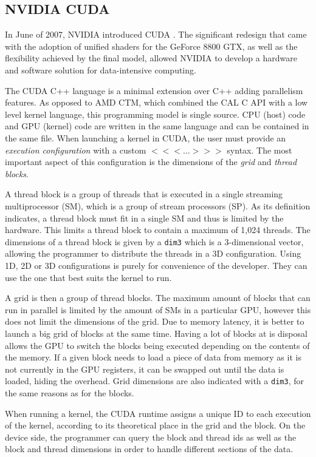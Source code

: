 \subsection{NVIDIA CUDA}

In June of 2007, NVIDIA introduced CUDA \cite{cuda_toolkit_archive}. The significant redesign that came with the adoption of unified shaders for the GeForce 8800 GTX, as well as the flexibility achieved by the final model, allowed NVIDIA to develop a hardware and software solution for data-intensive computing.

The CUDA C++ language is a minimal extension over C++ adding parallelism features. As opposed to AMD CTM, which combined the CAL C API with a low level kernel language, this programming model is single source. CPU (host) code and GPU (kernel) code are written in the same language and can be contained in the same file. When launching a kernel in CUDA, the user must provide an \textit{execution configuration} with a custom $<<< ... >>>$ syntax. The most important aspect of this configuration is the dimensions of the \textit{grid} and \textit{thread blocks}.

A thread block is a group of threads that is executed in a single streaming multiprocessor (SM), which is a group of stream processors (SP). As its definition indicates, a thread block must fit in a single SM and thus is limited by the hardware. This limits a thread block to contain a maximum of 1,024 threads. The dimensions of a thread block is given by a \texttt{dim3} which is a 3-dimensional vector, allowing the programmer to distribute the threads in a 3D configuration. Using 1D, 2D or 3D configurations is purely for convenience of the developer. They can use the one that best suits the kernel to run.

A grid is then a group of thread blocks. The maximum amount of blocks that can run in parallel is limited by the amount of SMs in a particular GPU, however this does not limit the dimensions of the grid. Due to memory latency, it is better to launch a big grid of blocks at the same time. Having a lot of blocks at is disposal allows the GPU to switch the blocks being executed depending on the contents of the memory. If a given block needs to load a piece of data from memory as it is not currently in the GPU registers, it can be swapped out until the data is loaded, hiding the overhead. Grid dimensions are also indicated with a \texttt{dim3}, for the same reasons as for the blocks.

When running a kernel, the CUDA runtime assigns a unique ID to each execution of the kernel, according to its theoretical place in the grid and the block. On the device side, the programmer can query the block and thread ids as well as the block and thread dimensions in order to handle different sections of the data. 

